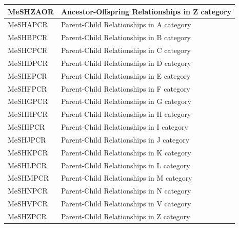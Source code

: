 \documentclass[11pt]{article}
\begin{document}
\begin{center}
\begin{table}[htbp]
\begin{tabular*}{150mm}{@{\extracolsep{\fill}}|p{40mm}|p{100mm}|}
      MeSHZAOR & Ancestor-Offspring Relationships in Z category \\ \hline \hline
      MeSHAPCR & Parent-Child Relationships in A category \\ \hline
      MeSHBPCR & Parent-Child Relationships in B category \\ \hline
      MeSHCPCR & Parent-Child Relationships in C category \\ \hline
      MeSHDPCR & Parent-Child Relationships in D category \\ \hline
      MeSHEPCR & Parent-Child Relationships in E category \\ \hline
      MeSHFPCR & Parent-Child Relationships in F category \\ \hline
      MeSHGPCR & Parent-Child Relationships in G category \\ \hline
      MeSHHPCR & Parent-Child Relationships in H category \\ \hline
      MeSHIPCR & Parent-Child Relationships in I category \\ \hline
      MeSHJPCR & Parent-Child Relationships in J category \\ \hline
      MeSHKPCR & Parent-Child Relationships in K category \\ \hline
      MeSHLPCR & Parent-Child Relationships in L category \\ \hline
      MeSHMPCR & Parent-Child Relationships in M category \\ \hline
      MeSHNPCR & Parent-Child Relationships in N category \\ \hline
      MeSHVPCR & Parent-Child Relationships in V category \\ \hline
      MeSHZPCR & Parent-Child Relationships in Z category \\ \hline
    \end{tabular*}
  \end{table}
\end{center}
\end{document}
